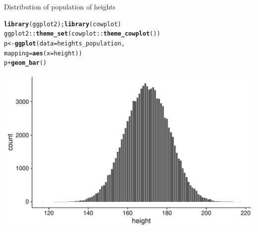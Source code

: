 \documentclass[10pt]{beamer}\usepackage[]{graphicx}\usepackage[]{color}
\makeatletter
\def\maxwidth{ %
  \ifdim\Gin@nat@width>\linewidth
    \linewidth
  \else
    \Gin@nat@width
  \fi
}
\newcommand{\hlopt}[1]{\textcolor[rgb]{0,0,0}{#1}}%
\newcommand{\hlstd}[1]{\textcolor[rgb]{0.345,0.345,0.345}{#1}}%
\newcommand{\hlkwb}[1]{\textcolor[rgb]{0.69,0.353,0.396}{#1}}%
\newcommand{\hlkwc}[1]{\textcolor[rgb]{0.333,0.667,0.333}{#1}}%
\newcommand{\hlkwd}[1]{\textcolor[rgb]{0.737,0.353,0.396}{\textbf{#1}}}%
\newenvironment{kframe}{%
 \def\at@end@of@kframe{}%
 \ifinner\ifhmode%
  \def\at@end@of@kframe{\end{minipage}}%
  \begin{minipage}{\columnwidth}%
 \fi\fi%
 \def\FrameCommand##1{\hskip\@totalleftmargin \hskip-\fboxsep
 \colorbox{shadecolor}{##1}\hskip-\fboxsep
     \hskip-\linewidth \hskip-\@totalleftmargin \hskip\columnwidth}%
 \MakeFramed {\advance\hsize-\width
   \@totalleftmargin\z@ \linewidth\hsize
   \@setminipage}}%
 {\par\unskip\endMakeFramed%
 \at@end@of@kframe}
\newenvironment{knitrout}{}{} %
\makeatother
\begin{document}
\begin{frame}[fragile]{Distribution of population of heights}
	
\begin{knitrout}\scriptsize
{}\color{fgcolor}\begin{kframe}
\begin{alltt}
\hlkwd{library}\hlstd{(ggplot2);} \hlkwd{library}\hlstd{(cowplot)}
\hlstd{ggplot2}\hlopt{::}\hlkwd{theme_set}\hlstd{(cowplot}\hlopt{::}\hlkwd{theme_cowplot}\hlstd{())}
\hlstd{p} \hlkwb{<-} \hlkwd{ggplot}\hlstd{(}\hlkwc{data} \hlstd{= heights_population,}
             \hlkwc{mapping} \hlstd{=} \hlkwd{aes}\hlstd{(}\hlkwc{x} \hlstd{= height))}
\hlstd{p} \hlopt{+} \hlkwd{geom_bar}\hlstd{()}
\end{alltt}
\end{kframe}

{\centering \includegraphics[width=\maxwidth]{figure/unnamed-chunk-4-1} 

}


\end{knitrout}
	
\end{frame}
\end{document}
